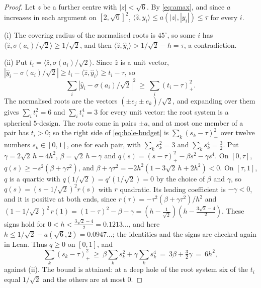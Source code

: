 \documentclass[11pt,reqno]{amsart}
\renewcommand{\_}{\origunderscore\allowbreak}
\numberwithin{equation}{section}
\theoremstyle{plain}
\theoremstyle{definition}
\theoremstyle{remark}
\begin{document}
\begin{proof}
Let $z$ be a further centre with $|z|<\sqrt6$. By \eqref{eq:amax}, and since
$a$ increases in each argument on $[2,\sqrt6]^2$,
$\langle\hat z,\hat y_i\rangle\le a(|z|,|y_i|)\le\tau$ for every $i$.

(i) The covering radius of the normalised roots is $45^\circ$, so some $i$
has $\langle\hat z,\sigma(a_i)/\sqrt2\rangle\ge1/\sqrt2$, and then
$\langle\hat z,\hat y_i\rangle>1/\sqrt2-h=\tau$, a contradiction.

(ii) Put $t_i=\langle\hat z,\sigma(a_i)/\sqrt2\rangle$. Since $\hat z$ is a
unit vector, $|\hat y_i-\sigma(a_i)/\sqrt2|\ge
t_i-\langle\hat z,\hat y_i\rangle\ge t_i-\tau$, so
\begin{equation}\label{eq:hole-budget}
  \sum_i|\hat y_i-\sigma(a_i)/\sqrt2|^2\ \ge\ \sum_i(t_i-\tau)_+^2 .
\end{equation}
The normalised roots are the vectors $(\pm e_j\pm e_k)/\sqrt2$, and
expanding over them gives $\sum_it_i^2=6$ and $\sum_it_i^4=3$ for every unit
vector: the root system is a spherical $5$-design. The roots come in pairs
$\pm a$, and at most one member of a pair has $t_i>0$; so the right side of
\eqref{eq:hole-budget} is $\sum_k(s_k-\tau)_+^2$ over twelve numbers
$s_k\in[0,1]$, one for each pair, with $\sum_ks_k^2=3$ and
$\sum_ks_k^4=\frac32$. Put $\gamma=2\sqrt2\,h-4h^2$, $\beta=\sqrt2\,h-\gamma$
and $q(s)=(s-\tau)_+^2-\beta s^2-\gamma s^4$. On $[0,\tau]$,
$q(s)\ge-s^2(\beta+\gamma\tau^2)$, and
$\beta+\gamma\tau^2=-2h^2(1-3\sqrt2\,h+2h^2)<0$. On $[\tau,1]$, $q$ is a
quartic with $q(1/\sqrt2)=q'(1/\sqrt2)=0$ by the choice of $\beta$ and
$\gamma$, so $q(s)=(s-1/\sqrt2)^2r(s)$ with $r$ quadratic. Its leading
coefficient is $-\gamma<0$, and it is positive at both ends, since
$r(\tau)=-\tau^2(\beta+\gamma\tau^2)/h^2$ and
$(1-1/\sqrt2)^2\,r(1)=(1-\tau)^2-\beta-\gamma
=(h-\tfrac1{\sqrt2})(h-\tfrac{3\sqrt2-4}2)$. These signs hold for
$0<h<\frac{3\sqrt2-4}2=0.1213\ldots$, and here
$h\le1/\sqrt2-a(\sqrt6,2)=0.0947\ldots$; the identities and the signs are
checked again in Lean. Thus $q\ge0$ on $[0,1]$, and
\[
  \sum_k(s_k-\tau)_+^2\ \ge\ \beta\sum_ks_k^2+\gamma\sum_ks_k^4
  \ =\ 3\beta+\tfrac32\gamma\ =\ 6h^2,
\]
against \textup{(ii)}. The bound is attained: at a deep hole of the root
system six of the $t_i$ equal $1/\sqrt2$ and the others are at most $0$.


\end{proof}
\end{document}
